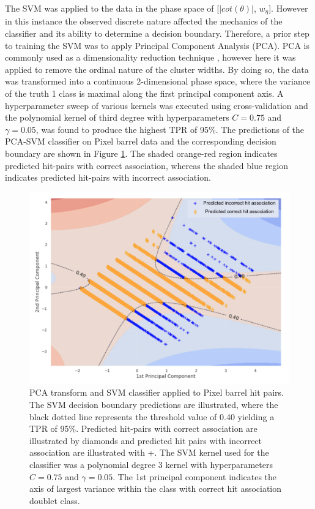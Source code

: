 The SVM was applied to the data in the phase space of  [$|cot(\theta)|$, $w_{\eta}$]. However in this instance the observed discrete nature affected the mechanics of the classifier and its ability to determine a decision boundary. Therefore, a prior step to training the SVM was to apply Principal Component Analysis (PCA). PCA is commonly used as a dimensionality reduction technique \cite{pca}, however here it was applied to remove the ordinal nature of the cluster widths. By doing so, the data was transformed into a continuous 2-dimensional phase space, where the variance of the truth 1 class is maximal along the first principal component axis. A hyperparameter sweep of various kernels was executed using cross-validation and the polynomial kernel of third degree with hyperparameters $C=0.75$ and $\gamma=0.05$, was found to produce the highest TPR of 95\%. The predictions of the PCA-SVM classifier on Pixel barrel data and the corresponding decision boundary are shown in Figure \ref{fig:barrel-svm-pca}. The shaded orange-red region indicates predicted hit-pairs with correct association, whereas the shaded blue region indicates predicted hit-pairs with incorrect association.

\begin{figure}[htbp]
\centering
\includegraphics[width=0.85\linewidth]{images/4-ml-based-predictor/barrel-svm-pca.png}
\caption{PCA transform and SVM classifier applied to Pixel barrel hit pairs. The SVM decision boundary predictions are illustrated, where the black dotted line represents the threshold value of 0.40 yielding a TPR of 95\%. Predicted hit-pairs with correct association are illustrated by diamonds and predicted hit pairs with incorrect association are illustrated with +. The SVM kernel used for the classifier was a polynomial degree 3 kernel with hyperparameters $C=0.75$ and $\gamma=0.05$. The 1st principal component indicates the axis of largest variance within the class with correct hit association doublet class.}
\label{fig:barrel-svm-pca}
\end{figure}

